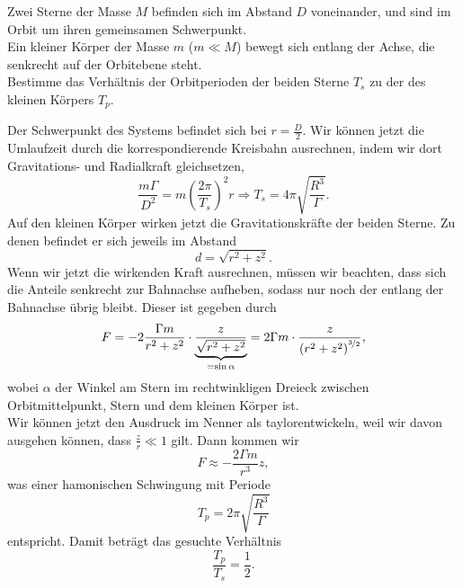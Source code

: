 \begin{minipage}[b]{0.6\textwidth}
\begin{Exercise}[label = hamos, difficulty = 2, origin = {USAPhO 2009, Halbfinale}, title = {Oszillierendes Drei-Körper-Problem}]
	Zwei Sterne der Masse $M$ befinden sich im Abstand $D$ voneinander, und sind im Orbit um ihren gemeinsamen Schwerpunkt. \\
	Ein kleiner Körper der Masse $m$ ($m\ll M$) bewegt sich entlang der Achse, die senkrecht auf der Orbitebene steht.\\
	Bestimme das Verhältnis der Orbitperioden der beiden Sterne $T_s$ zu der des kleinen Körpers $T_p$.
\end{Exercise}
\end{minipage}
\begin{minipage}[b]{0.4\textwidth}
	\centering
	
\end{minipage}
\begin{Answer}[ref = hamos]
	Der Schwerpunkt des Systems befindet sich bei $r = \frac{D}{2}$. Wir können jetzt die Umlaufzeit durch die korrespondierende Kreisbahn ausrechnen, indem wir dort Gravitations- und Radialkraft gleichsetzen,
	\begin{equation}\label{hamos:ts}
		\frac{m\Gamma}{D^2} = m \left(\frac{2\pi}{T_s}\right)^2 r \Rightarrow T_s = 4\pi\sqrt{ \frac{R^3}{\Gamma}}.
	\end{equation}
	Auf den kleinen Körper wirken jetzt die Gravitationskräfte der beiden Sterne. Zu denen befindet er sich jeweils im Abstand 
	\begin{equation}
		d = \sqrt{r^2+z^2}.
	\end{equation}
	Wenn wir jetzt die wirkenden Kraft ausrechnen, müssen wir beachten, dass sich die Anteile senkrecht zur Bahnachse aufheben, sodass nur noch der entlang der Bahnachse übrig bleibt.
	Dieser ist gegeben durch
	\begin{equation}\label{hamos:fe}
		F =- 2\frac{\Gamma m}{r^2+z^2} \cdot \underbrace{\frac{z}{\sqrt{r^2+z^2}}}_{=\sin \alpha} = 2\Gamma m\cdot \frac{z}{\left(r^2+z^2\right)^{\nicefrac{3}{2}}},
	\end{equation}
	wobei $\alpha$ der Winkel am Stern im rechtwinkligen Dreieck zwischen Orbitmittelpunkt, Stern und dem kleinen Körper ist.\\
	Wir können jetzt den Ausdruck im Nenner als taylorentwickeln, weil wir davon ausgehen können, dass $\frac{z}{r}\ll 1$ gilt. Dann kommen wir
	\begin{equation}
		F \approx - \frac{2\Gamma m}{r^3}z,
	\end{equation}
	was einer hamonischen Schwingung mit Periode 
	\begin{equation}
		T_p =2\pi  \sqrt{\frac{R^3}{\Gamma}}
	\end{equation}
	entspricht. Damit beträgt das gesuchte Verhältnis 
	\begin{equation}
		\boxed{
			\frac{T_p}{T_s} = \frac{1}{2}.
			}
	\end{equation}
\end{Answer}